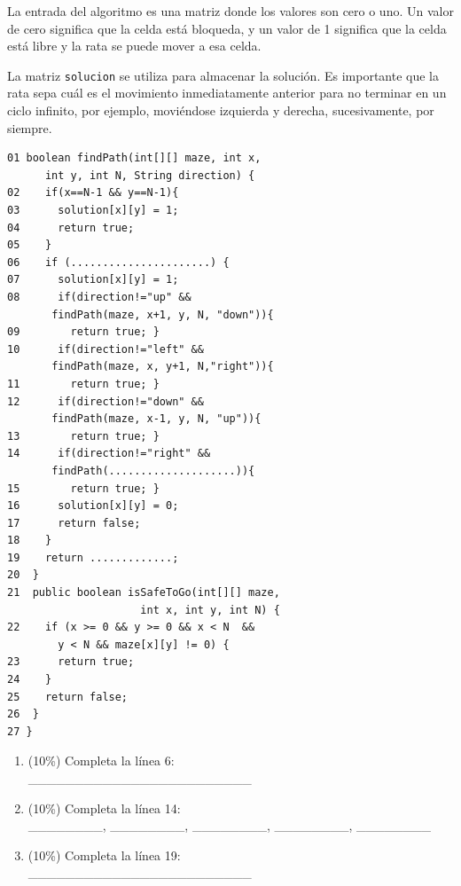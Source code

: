 \documentclass[twocolumn]{article}
\begin{document}
La entrada del algoritmo es una matriz donde los valores son cero o uno. Un valor de cero significa que la celda
está bloqueda, y un valor de 1 significa que la celda está libre y la rata se puede mover a esa celda.

La matriz \texttt{solucion} se utiliza para almacenar la solución. Es importante que la rata sepa cuál es el movimiento
inmediatamente anterior para no terminar en un ciclo infinito, por ejemplo, moviéndose izquierda y derecha, sucesivamente,
por siempre. 

\begin{verbatim}
01 boolean findPath(int[][] maze, int x, 
      int y, int N, String direction) {
02    if(x==N-1 && y==N-1){
03      solution[x][y] = 1;
04      return true;
05    }
06    if (......................) {
07      solution[x][y] = 1;     
08      if(direction!="up" && 
       findPath(maze, x+1, y, N, "down")){ 
09        return true; }
10      if(direction!="left" && 
       findPath(maze, x, y+1, N,"right")){ 
11        return true; }
12      if(direction!="down" && 
       findPath(maze, x-1, y, N, "up")){ 
13        return true; }
14      if(direction!="right" &&  
       findPath(....................)){ 
15        return true; }
16      solution[x][y] = 0;
17      return false;
18    }
19    return .............;
20  }
21  public boolean isSafeToGo(int[][] maze, 
                     int x, int y, int N) {
22    if (x >= 0 && y >= 0 && x < N  && 
        y < N && maze[x][y] != 0) {
23      return true;
24    }
25    return false;
26  }
27 }
\end{verbatim}


\begin{enumerate}[label=\Alph*]


    \item (10\%) Completa la línea 6: \\


  \_\_\_\_\_\_\_\_\_\_\_\_\_\_\_\_\_\_\_\_\_\_\_\_


    \item (10\%) Completa la línea 14:\\


  \_\_\_\_\_\_\_\_, \_\_\_\_\_\_\_\_, \_\_\_\_\_\_\_\_, \_\_\_\_\_\_\_\_, \_\_\_\_\_\_\_\_


    \item (10\%) Completa la línea 19:\\


  \_\_\_\_\_\_\_\_\_\_\_\_\_\_\_\_\_\_\_\_\_\_\_\_



\end{enumerate}
\end{document}
